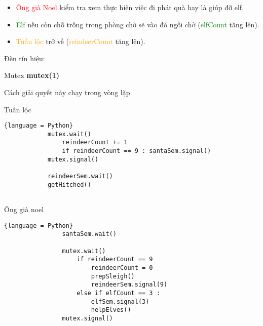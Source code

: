 \documentclass[a4paper]{article}
\begin{document}
    \begin{itemize}
        \item \textcolor{red}{Ông già Noel} kiểm tra xem thực hiện việc đi phát quà hay là giúp đỡ elf.
        \item \textcolor{green}{Elf} nếu còn chỗ trống trong phòng chờ sẽ vào đó ngồi chờ (\textcolor{green}{elfCount} tăng lên).
         \item \textcolor{orange}{Tuần lộc} trở về (\textcolor{orange}{reindeerCount} tăng lên).
    \end{itemize}
   
    Đèn tín hiệu:
   
    \begin{center}
        \begin{tcolorbox}    
            Mutex \textbf{mutex(1)}
        \end{tcolorbox}
    \end{center}
   
    
    Cách giải quyết này chạy trong vòng lặp
    
    \begin{center}
        Tuần lộc
        \begin{tcolorbox}
            \begin{lstlisting}{language = Python}
            mutex.wait()
                reindeerCount += 1
                if reindeerCount == 9 : santaSem.signal()
            mutex.signal()
 
            reindeerSem.wait()
            getHitched()
            
            \end{lstlisting}
        \end{tcolorbox}
    \end{center}
    
    \begin{center}
        Ông già noel
        \begin{tcolorbox}
            \begin{lstlisting}{language = Python}
                santaSem.wait()

                mutex.wait()
                    if reindeerCount == 9 
                        reindeerCount = 0
                        prepSleigh()
                        reindeerSem.signal(9)
                    else if elfCount == 3 : 
                        elfSem.signal(3)
                        helpElves()
                mutex.signal()
            \end{lstlisting}
        \end{tcolorbox}
    \end{center}
    
\end{document}
